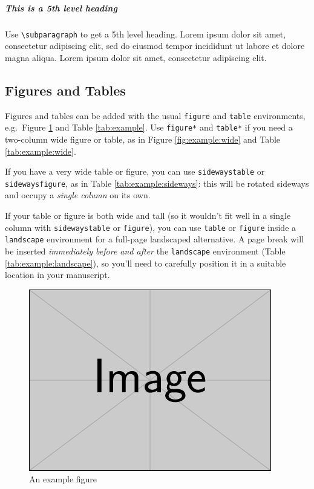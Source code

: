 \documentclass[a4paper,num-refs]{ehi-journals}
\begin{document}
\subparagraph{This is a 5th level heading}

Use \verb|\subparagraph| to get a 5th level heading.
Lorem ipsum dolor sit amet, consectetur adipiscing elit, sed do eiusmod tempor incididunt ut labore et dolore magna aliqua. Lorem ipsum dolor sit amet, consectetur adipiscing elit.


\subsection{Figures and Tables}
Figures and tables can be added with the usual \verb|figure| and \verb|table| environments, e.g.~Figure \ref{fig:example} and Table \ref{tab:example}. Use \verb|figure*| and \verb|table*| if you need a two-column wide figure or table, as in Figure \ref{fig:example:wide} and Table \ref{tab:example:wide}. 

If you have a very wide table or figure, you can use \texttt{sidewaystable} or \texttt{sidewaysfigure}, as in Table \ref{tab:example:sideways}: this will be rotated sideways and occupy a \emph{single column} on its own.

If your table or figure is both wide and tall (so it wouldn't fit well in a single column with \texttt{sidewaystable} or \texttt{figure}), 
you can use \verb|table| or \verb|figure| inside a \verb|landscape| environment for a full-page landscaped alternative. A page break will be inserted \emph{immediately before and after} the \verb|landscape| environment (Table \ref{tab:example:landscape}), so you'll need to carefully position it in a suitable location in your manuscript.

\begin{figure}[bt!] %
\centering
\includegraphics[width=\linewidth]{example-image}
\caption{An example figure}\label{fig:example}
\end{figure}
\end{document}
